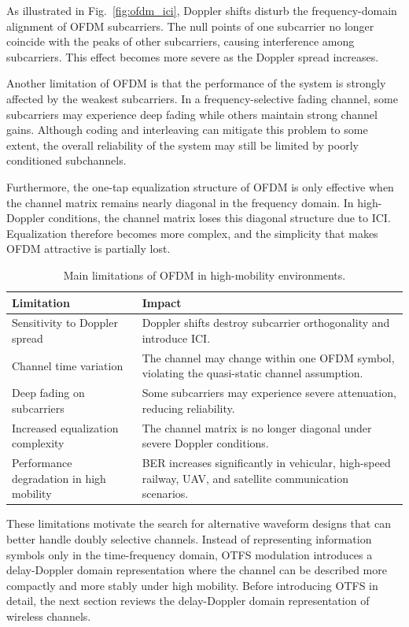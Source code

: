 As illustrated in Fig.~\ref{fig:ofdm_ici}, Doppler shifts disturb the frequency-domain alignment of OFDM subcarriers. The null points of one subcarrier no longer coincide with the peaks of other subcarriers, causing interference among subcarriers. This effect becomes more severe as the Doppler spread increases.

Another limitation of OFDM is that the performance of the system is strongly affected by the weakest subcarriers. In a frequency-selective fading channel, some subcarriers may experience deep fading while others maintain strong channel gains. Although coding and interleaving can mitigate this problem to some extent, the overall reliability of the system may still be limited by poorly conditioned subchannels.

Furthermore, the one-tap equalization structure of OFDM is only effective when the channel matrix remains nearly diagonal in the frequency domain. In high-Doppler conditions, the channel matrix loses this diagonal structure due to ICI. Equalization therefore becomes more complex, and the simplicity that makes OFDM attractive is partially lost.

\begin{table}[H]
\centering
\caption{Main limitations of OFDM in high-mobility environments.}
\label{tab:ofdm_limitations}

\begin{tabular}{|p{4cm}|p{8cm}|}
\hline
\textbf{Limitation} &
\textbf{Impact} \\
\hline

Sensitivity to Doppler spread &
Doppler shifts destroy subcarrier orthogonality and introduce ICI. \\
\hline

Channel time variation &
The channel may change within one OFDM symbol, violating the quasi-static channel assumption. \\
\hline

Deep fading on subcarriers &
Some subcarriers may experience severe attenuation, reducing reliability. \\
\hline

Increased equalization complexity &
The channel matrix is no longer diagonal under severe Doppler conditions. \\
\hline

Performance degradation in high mobility &
BER increases significantly in vehicular, high-speed railway, UAV, and satellite communication scenarios. \\
\hline

\end{tabular}

\end{table}

These limitations motivate the search for alternative waveform designs that can better handle doubly selective channels. Instead of representing information symbols only in the time-frequency domain, OTFS modulation introduces a delay-Doppler domain representation where the channel can be described more compactly and more stably under high mobility. Before introducing OTFS in detail, the next section reviews the delay-Doppler domain representation of wireless channels.
